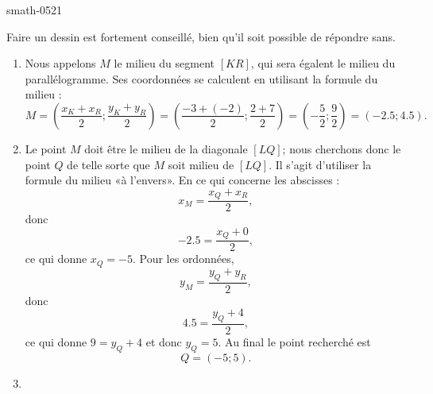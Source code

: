 
\begin{corrige}{smath-0521}

    Faire un dessin est fortement conseillé, bien qu'il soit possible de répondre sans.
    
    \begin{enumerate}
        \item
            
    Nous appelons \( M\) le milieu du segment \( [KR]\), qui sera égalent le milieu du parallélogramme. Ses coordonnées se calculent en utilisant la formule du milieu :
    \begin{equation}
        M=\left( \frac{ x_K+x_R }{2};\frac{ y_K+y_R }{2} \right)=\left( \frac{ -3+(-2) }{2};\frac{ 2+7 }{2} \right)=\left( -\frac{ 5 }{2};\frac{ 9 }{2} \right)=(-2.5;4.5).
    \end{equation}

        \item

            Le point \( M\) doit être le milieu de la diagonale \( [LQ]\); nous cherchons donc le point \( Q\) de telle sorte que \( M\) soit milieu de \( [LQ]\). Il s'agit d'utiliser la formule du milieu «à l'envers». En ce qui concerne les abscisses :
            \begin{equation}
                x_M=\frac{ x_Q+x_R }{ 2 },
            \end{equation}
            donc
            \begin{equation}
                -2.5=\frac{ x_Q+0 }{2},
            \end{equation}
            ce qui donne \( x_Q=-5\). Pour les ordonnées,
            \begin{equation}
                y_M=\frac{ y_Q+y_R }{ 2 },
            \end{equation}
            donc
            \begin{equation}
                4.5=\frac{ y_Q+4 }{2},
            \end{equation}
            ce qui donne \( 9=y_Q+4\) et donc \( y_Q=5\). Au final le point recherché est
            \begin{equation}
                Q=(-5;5).
            \end{equation}

        \item


\end{enumerate}
\end{corrige}
